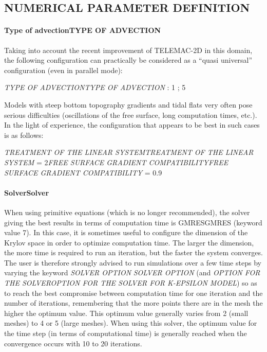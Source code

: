 \documentclass{article} %
\begin{document}
\subsection{ NUMERICAL PARAMETER DEFINITION}


\paragraph{ Type of advectionTYPE OF ADVECTION}

 Taking into account the recent improvement of TELEMAC-2D in this domain, the following configuration can practically be considered as a ``quasi universal'' configuration (even in parallel mode):

 \textit{TYPE OF ADVECTIONTYPE OF ADVECTION} :  1 ; 5

 Models with steep bottom topography gradients and tidal flats very often pose serious difficulties (oscillations of the free surface, long computation times, etc.). In the light of experience, the configuration that appears to be best in such cases is as follows:

 \textit{TREATMENT OF THE LINEAR SYSTEMTREATMENT OF THE LINEAR SYSTEM} = 2\textit{FREE SURFACE GRADIENT COMPATIBILITYFREE SURFACE GRADIENT COMPATIBILITY} = 0.9


\paragraph{ SolverSolver}

 When using primitive equations (which is no longer recommended), the solver giving the best results in terms of computation time is GMRESGMRES (keyword value 7). In this case, it is sometimes useful to configure the dimension of the Krylov space in order to optimize computation time. The larger the dimension, the more time is required to run an iteration, but the faster the system converges. The user is therefore strongly advised to run simulations over a few time steps by varying the keyword \textit{SOLVER OPTION} \textit{SOLVER OPTION} (and \textit{OPTION FOR THE SOLVEROPTION FOR THE SOLVER FOR K-EPSILON MODEL}) so as to reach the best compromise between computation time for one iteration and the number of iterations, remembering that the more points there are in the mesh the higher the optimum value. This optimum value generally varies from 2 (small meshes) to 4 or 5 (large meshes). When using this solver, the optimum value for the time step (in terms of computational time) is generally reached when the convergence occurs with 10 to 20 iterations.
\end{document}
